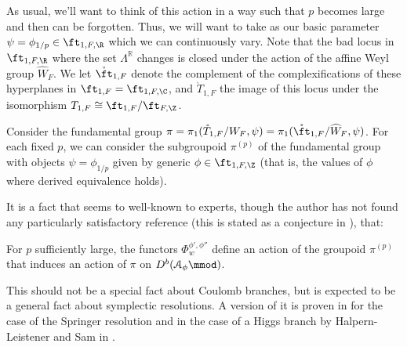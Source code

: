 As usual, we'll want to think of this action in a way such that $p$ becomes large and then can be forgotten.  Thus, we will want to take as our basic parameter $\psi=\phi_{1/p}\in \ft_{1,F,\R}$ which we can continuously vary.  Note that the bad locus in $\ft_{1,F,\R}$ where the set $\Lambda^{\mathbb{R}}$ changes is closed under the action of the affine Weyl group $\widehat{W}_F$.  We let $\mathring{\ft}_{1,F}$ denote the complement of the complexifications of these hyperplanes in $\ft_{1,F}=\ft_{1,F,\C}$, and $\mathring{T}_{1,F}$ the image of this locus under the isomorphism $T_{1,F}\cong \ft_{1,F}/\ft_{F,\Z}$.


Consider the fundamental group $\pi=\pi_1(\mathring{T}_{1,F}/W_F,\psi)=\pi_1(\mathring{\ft}_{1,F}/\widehat{W}_F,\psi)$. %
For each fixed $p$, we can consider the subgroupoid $\pi^{(p)}$ of the fundamental group with objects $\psi=\phi_{1/p}$ given by generic $\phi\in \ft_{1,F,\Z}$ (that is, the values of $\phi$ where derived equivalence holds).  

It is a fact that seems to well-known to experts, though the author has not found any particularly satisfactory reference (this is stated as a conjecture in \cite[\S 3.2.8]{OkGRT}), that:
\begin{proposition}\label{prop:pi-action}
For $p$ sufficiently large,  the functors $\Phi_w^{\phi',\phi''}$  define an action of the groupoid $\pi^{(p)}$ that induces an action of $\pi$ on $D^b(\EuScript{A}_{\phi}\mmod)$.
\end{proposition}
This should not be a special fact about Coulomb branches, but is expected to be a general fact about symplectic resolutions.  A version of it is proven in \cite{BezRiche} for the case of the Springer resolution and in the case of a Higgs branch by Halpern-Leistener and Sam in \cite{HLSdeq}.

